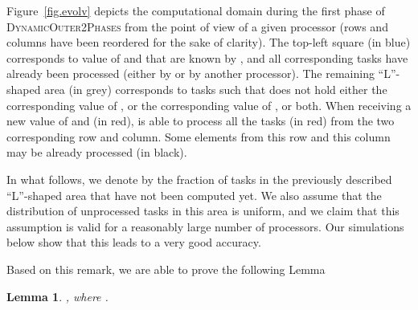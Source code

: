 \documentclass[a4paper,10pt]{article}
\newtheorem{lemma}[theorem]{Lemma}
\newcommand{\stupidthreshold}{\textsc{Dynamic\-Outer\-2Phases}\xspace}
\begin{document}
Figure~\ref{fig.evolv} depicts the computational domain during the
first phase of \stupidthreshold from the point of view of a given
processor  (rows and columns have been reordered for the sake of
clarity). The top-left square (in blue) corresponds to value of 
and  that are known by , and all corresponding tasks have
already been processed (either by  or by another processor). The
remaining ``L''-shaped area (in grey) corresponds to tasks 
such that  does not hold either the corresponding value of ,
or the corresponding value of , or both. When receiving a new value
of  and  (in red),  is able to process all the tasks (in
red) from the two corresponding row and column. Some elements from
this row and this column may be already processed (in black).

In what follows, we denote by  the fraction of tasks 
in the previously described ``L''-shaped area that have not been
computed yet. We also assume that the distribution of unprocessed
tasks in this area is uniform, and we claim that this assumption is
valid for a reasonably large number of processors. Our simulations
below show that this leads to a very good accuracy.


Based on this remark, we are able to prove the following Lemma
\begin{lemma}
\label{lemg}
, where .
\end{lemma}
\end{document}
